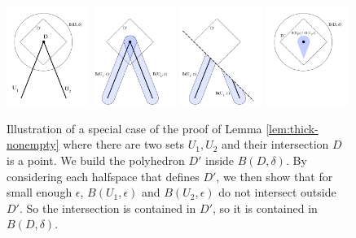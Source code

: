 \documentclass[twoside,11pt]{article}
\begin{document}
\begin{figure}
\caption{Illustration of a special case of the proof of Lemma \ref{lem:thick-nonempty} where there are two sets $U_1,U_2$ and their intersection $D$ is a point. We build the polyhedron $D'$ inside $B(D,\delta)$. By considering each halfspace that defines $D'$, we then show that for small enough $\epsilon$, $B(U_1,\epsilon)$ and $B(U_2,\epsilon)$ do not intersect outside $D'$. So the intersection is contained in $D'$, so it is contained in $B(D,\delta)$.}
\includegraphics[width=0.24\textwidth]{figs/separated-proof-2} \hfill
\includegraphics[width=0.24\textwidth]{figs/separated-proof-3} \hfill
\includegraphics[width=0.24\textwidth]{figs/separated-proof-4} \hfill
\includegraphics[width=0.24\textwidth]{figs/separated-proof-5}
\end{figure}
\end{document}
